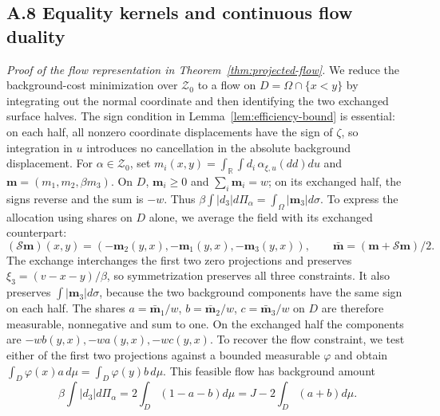 \subsection{A.8 Equality kernels and continuous flow duality}\label{app:flow-proof}

\leavevmode{}\label{proof:flow-representation}
\textit{Proof of the flow representation in Theorem~\ref{thm:projected-flow}.} We reduce the background-cost minimization over \(\mathcal Z_0\) to a flow on \(D=\Omega\cap\{x<y\}\) by integrating out the normal coordinate and then identifying the two exchanged surface halves. The sign condition in Lemma~\ref{lem:efficiency-bound} is essential: on each half, all nonzero coordinate displacements have the sign of \(\zeta\), so integration in \(u\) introduces no cancellation in the absolute background displacement. For \(\alpha\in\mathcal Z_0\), set \(m_i(x,y)=\int_{\mathbb R}\int d_i\,\alpha_{\xi,u}(dd)du\) and \(\mathbf m=(m_1,m_2,\beta m_3)\). On \(D\), \(\mathbf m_i\ge0\) and \(\sum_i \mathbf m_i=w\); on its exchanged half, the signs reverse and the sum is \(-w\). Thus \(\beta\int|d_3|d\Pi_\alpha=\int_\Omega|\mathbf m_3|d\sigma\). To express the allocation using shares on \(D\) alone, we average the field with its exchanged counterpart:
\begin{equation}
(\mathscr S\mathbf m)(x,y)=(-\mathbf m_2(y,x),-\mathbf m_1(y,x),-\mathbf m_3(y,x)),
\qquad \bar{\mathbf m}=(\mathbf m+\mathscr S\mathbf m)/2.
\tag{A.55}\label{eq:A.55}
\end{equation}
The exchange interchanges the first two zero projections and preserves \(\xi_3=(v-x-y)/\beta\), so symmetrization preserves all three constraints. It also preserves \(\int|\mathbf m_3|d\sigma\), because the two background components have the same sign on each half. The shares \(a=\bar{\mathbf m}_1/w\), \(b=\bar{\mathbf m}_2/w\), \(c=\bar{\mathbf m}_3/w\) on \(D\) are therefore measurable, nonnegative and sum to one. On the exchanged half the components are \(-wb(y,x),-wa(y,x),-wc(y,x)\). To recover the flow constraint, we test either of the first two projections against a bounded measurable \(\varphi\) and obtain \(\int_D\varphi(x)a\,d\mu=\int_D\varphi(y)b\,d\mu\). This feasible flow has background amount
\begin{equation}
\beta\int|d_3|d\Pi_\alpha
=2\int_D(1-a-b)d\mu
=J-2\int_D(a+b)d\mu.
\tag{A.56}\label{eq:A.56}
\end{equation}

